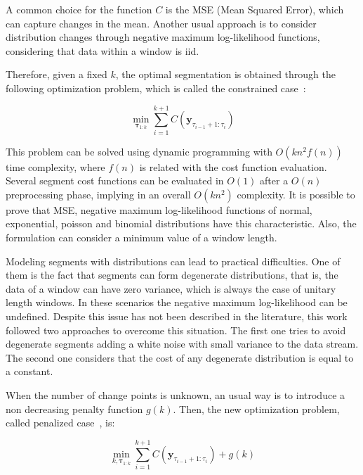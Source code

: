 A common choice for the function $C$ is the MSE (Mean Squared Error), which can
capture changes in the mean. Another usual approach is to consider distribution
changes through negative maximum log-likelihood functions, considering that data
within a window is iid.

Therefore, given a fixed $k$, the optimal segmentation is obtained through the
following optimization problem, which is called the constrained
case~\cite{on_optimal_multiple_changepoint_algorithms_for_large_data}:

\begin{equation}
    \min_{\boldsymbol \tau_{1 : k}} \sum \limits_{i = 1}^{k + 1} C(\mathbf{y}_{\tau_{i - 1} + 1 : \tau_{i}})
\end{equation}

This problem can be solved using dynamic programming with $O(k n^2 f(n))$ time
complexity, where $f(n)$ is related with the cost function evaluation. Several
segment cost functions can be evaluated in $O(1)$ after a $O(n)$ preprocessing
phase, implying in an overall $O(k n^2)$ complexity. It is possible to prove
that MSE, negative maximum log-likelihood functions of normal, exponential,
poisson and binomial distributions have this characteristic. Also, the
formulation can consider a minimum value of a window length.

Modeling segments with distributions can lead to practical difficulties. One of
them is the fact that segments can form degenerate distributions, that is, the
data of a window can have zero variance, which is always the case of unitary
length windows. In these scenarios the negative maximum log-likelihood can be
undefined. Despite this issue has not been described in the literature,
this work followed two approaches to overcome this situation. The first one
tries to avoid degenerate segments adding a white noise with small variance to
the data stream. The second one considers that the cost of any degenerate
distribution is equal to a constant.

When the number of change points is unknown, an usual way is to introduce a non
decreasing penalty function $g(k)$. Then, the new optimization problem, called
penalized case~\cite{on_optimal_multiple_changepoint_algorithms_for_large_data},
is:

\begin{equation}
    \min_{k, \boldsymbol \tau_{1 : k}} \sum \limits_{i = 1}^{k + 1} C(\mathbf{y}_{\tau_{i - 1} + 1 : \tau_{i}}) + g(k)
\end{equation}

